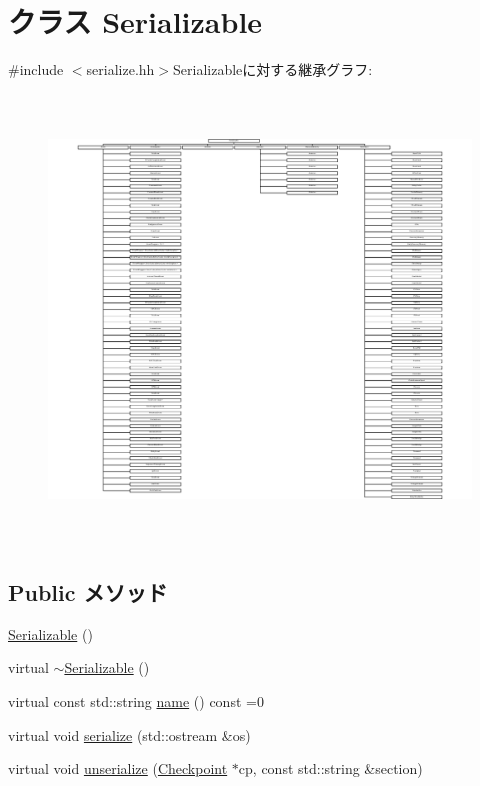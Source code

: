 \hypertarget{classSerializable}{
\section{クラス Serializable}
\label{classSerializable}
}


{\ttfamily \#include $<$serialize.hh$>$}Serializableに対する継承グラフ:\begin{figure}[H]
\begin{center}
\leavevmode
\includegraphics[height=11.9149cm]{classSerializable}
\end{center}
\end{figure}
\subsection*{Public メソッド}
\begin{DoxyCompactItemize}
\item 
\hyperlink{classSerializable_a5337d2e15eb1015f082089009cc0eab4}{Serializable} ()
\item 
virtual \hyperlink{classSerializable_af4712193652249f021f08d4de52f7573}{$\sim$Serializable} ()
\item 
virtual const std::string \hyperlink{classSerializable_a2d319721a65496069642871a52e47056}{name} () const =0
\item 
virtual void \hyperlink{classSerializable_ad6272f80ae37e8331e3969b3f072a801}{serialize} (std::ostream \&os)
\item 
virtual void \hyperlink{classSerializable_af100c4e9feabf3cd918619c88c718387}{unserialize} (\hyperlink{classCheckpoint}{Checkpoint} $\ast$cp, const std::string \&section)
\end{DoxyCompactItemize}
